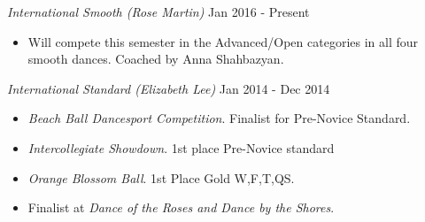 {\sl International Smooth (Rose Martin)} \hfill Jan 2016 - Present \
\begin{itemize} \itemsep -2pt
  \item Will compete this semester in the Advanced/Open categories
  in all four smooth dances.  Coached by Anna Shahbazyan.
\end{itemize}

{\sl International Standard (Elizabeth Lee)} \hfill Jan 2014 - Dec 2014 \
\begin{itemize} \itemsep -2pt
  \item \textit{Beach Ball Dancesport Competition}. Finalist for Pre-Novice Standard.
  \item \textit{Intercollegiate Showdown}. 1st place Pre-Novice standard
  \item \textit{Orange Blossom Ball}. 1st Place Gold W,F,T,QS.
  \item Finalist at \textit{Dance of the Roses and Dance by the Shores}.
\end{itemize}